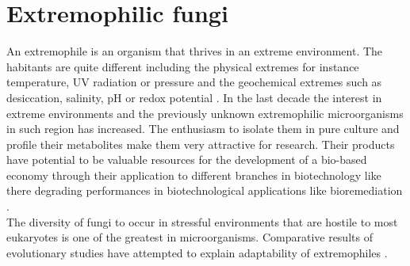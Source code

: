 \documentclass[12pt, a4paper]{report}
\begin{document}
\section{Extremophilic fungi}
An extremophile is an organism that thrives in an extreme environment. The habitants are quite different including the physical extremes for instance temperature, UV radiation or pressure and the geochemical extremes such as desiccation, salinity, pH or redox potential \cite{Rothschild2001}.  
In the last decade the interest in extreme environments and the previously unknown extremophilic microorganisms in such region has increased. The enthusiasm to isolate them in pure culture and profile their metabolites make them very attractive for research. Their products have potential to be valuable resources for the development of a bio-based economy through their application to different branches in biotechnology like there degrading performances in biotechnological applications like bioremediation \cite{Raddadi2015}. \\
The diversity of fungi to occur in stressful environments that are hostile to most eukaryotes is one of the greatest in microorganisms. Comparative results of evolutionary studies have attempted to explain adaptability of extremophiles \cite{Gostincar2010}.  
\end{document}
